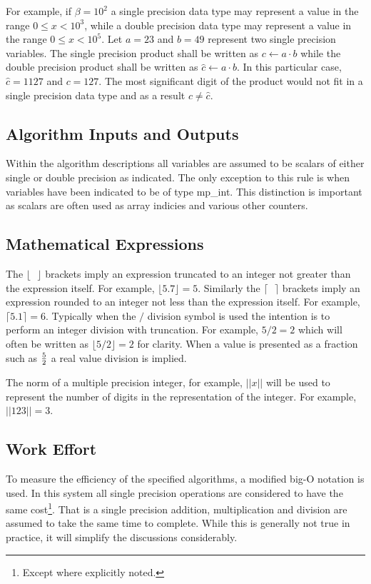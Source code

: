 \documentclass[b5paper]{book}
\begin{document}
For example, if $\beta = 10^2$ a single precision data type may represent a value in the 
range $0 \le x < 10^3$, while a double precision data type may represent a value in the range $0 \le x < 10^5$.  Let
$a = 23$ and $b = 49$ represent two single precision variables.  The single precision product shall be written
as $c \leftarrow a \cdot b$ while the double precision product shall be written as $\hat c \leftarrow a \cdot b$.
In this particular case, $\hat c = 1127$ and $c = 127$.  The most significant digit of the product would not fit 
in a single precision data type and as a result $c \ne \hat c$.  

\subsection{Algorithm Inputs and Outputs}
Within the algorithm descriptions all variables are assumed to be scalars of either single or double precision
as indicated.  The only exception to this rule is when variables have been indicated to be of type mp\_int.  This 
distinction is important as scalars are often used as array indicies and various other counters.  

\subsection{Mathematical Expressions}
The $\lfloor \mbox{ } \rfloor$ brackets imply an expression truncated to an integer not greater than the expression 
itself.  For example, $\lfloor 5.7 \rfloor = 5$.  Similarly the $\lceil \mbox{ } \rceil$ brackets imply an expression
rounded to an integer not less than the expression itself.  For example, $\lceil 5.1 \rceil = 6$.  Typically when 
the $/$ division symbol is used the intention is to perform an integer division with truncation.  For example, 
$5/2 = 2$ which will often be written as $\lfloor 5/2 \rfloor = 2$ for clarity.  When a value is presented as a 
fraction such as $5 \over 2$ a real value division is implied.  

The norm of a multiple precision integer, for example, $\vert \vert x \vert \vert$ will be used to represent the number of digits in the representation
of the integer.  For example, $\vert \vert 123 \vert \vert = 3$.  

\subsection{Work Effort}
To measure the efficiency of the specified algorithms, a modified big-O notation is used.  In this system all 
single precision operations are considered to have the same cost\footnote{Except where explicitly noted.}.  
That is a single precision addition, multiplication and division are assumed to take the same time to 
complete.  While this is generally not true in practice, it will simplify the discussions considerably.
\end{document}
